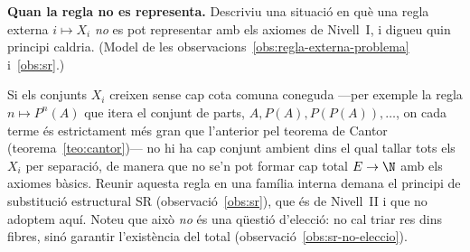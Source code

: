 \begin{exercici}
\textbf{Quan la regla no es representa.} Descriviu una situació en què una regla externa \(i\mapsto X_i\) \emph{no} es pot representar amb els axiomes de Nivell~I, i digueu quin principi caldria. (Model de les observacions~\ref{obs:regla-externa-problema} i~\ref{obs:sr}.)
\end{exercici}
\begin{solucio}
Si els conjunts \(X_i\) creixen sense cap cota comuna coneguda ---per exemple la regla \(n\mapsto P^n(A)\) que itera el conjunt de parts, \(A, P(A), P(P(A)),\dots\), on cada terme és estrictament més gran que l'anterior pel teorema de Cantor (teorema~\ref{teo:cantor})--- no hi ha cap conjunt ambient dins el qual tallar tots els \(X_i\) per separació, de manera que no se'n pot formar cap total \(E\to\N\) amb els axiomes bàsics. Reunir aquesta regla en una família interna demana el principi de substitució estructural SR (observació~\ref{obs:sr}), que és de Nivell~II i que no adoptem aquí. Noteu que això \emph{no} és una qüestió d'elecció: no cal triar res dins fibres, sinó garantir l'existència del total (observació~\ref{obs:sr-no-eleccio}).
\end{solucio}
